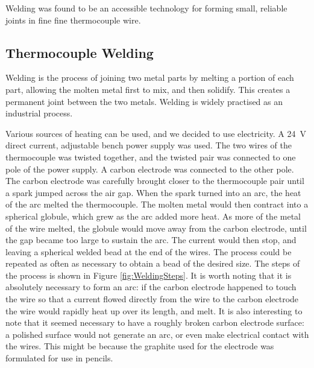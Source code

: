 Welding was found to be an accessible technology for forming small, reliable
joints in fine fine thermocouple wire.

\subsection{Thermocouple Welding}

Welding is the process of joining two metal parts by melting a portion of each
part, allowing the molten metal first to mix, and then solidify. This creates a
permanent joint between the two metals. Welding is widely practised as an
industrial process.

Various sources of heating can be used, and we decided to use electricity. A
\SI{24}{\volt} direct current, adjustable bench power supply was used. The two
wires of the thermocouple was twisted together, and the twisted pair was
connected to one pole of the power supply. A carbon electrode was connected to
the other pole. The carbon electrode was carefully brought closer to the
thermocouple pair until a spark jumped across the air gap. When the spark turned
into an arc, the heat of the arc melted the thermocouple. The molten metal would
then contract into a spherical globule, which grew as the arc added more heat.
As more of the metal of the wire melted, the globule would move away from the
carbon electrode, until the gap became too large to sustain the arc. The current
would then stop, and leaving a spherical welded bead at the end of the wires. The
process could be repeated as often as necessary to obtain a bead of the desired
size. The steps of the process is shown in Figure \ref{fig:WeldingSteps}. It is
worth noting that it is absolutely necessary to form an arc: if the carbon
electrode happened to touch the wire so that a current flowed directly from the
wire to the carbon electrode the wire would rapidly heat up over its length, and
melt. It is also interesting to note that it seemed necessary to have a roughly
broken carbon electrode surface: a polished surface would not generate an arc,
or even make electrical contact with the wires. This might be because the
graphite used for the electrode was formulated for use in pencils.

